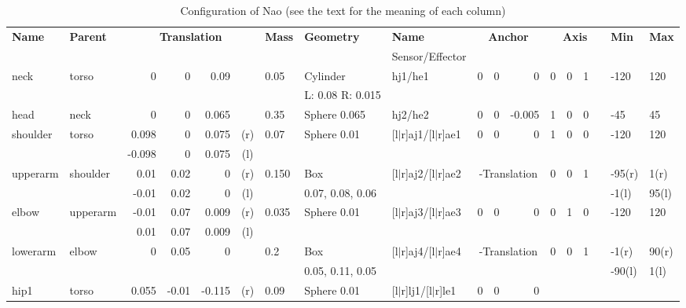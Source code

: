 \begin{landscape}
\begin{table}
  \centering
  \label{tab:nao-conf}
  \caption{Configuration of Nao (see the text for the meaning of each
    column)}
  \newcommand{\threegrid}[1]{\multicolumn{3}{c|}{#1}}
  \newcommand{\fourgrid}[1]{\multicolumn{4}{c|}{#1}}
  \begin{tabular}{|l|l|r@{,}r@{,}r@{}c|l|l|l|r@{,}r@{,}r|r@{,}r@{,}l@{}c|l|l|}
    \hline
    {\bf Name} & {\bf Parent} & \fourgrid{\bf Translation} &
    {\bf Mass} & {\bf Geometry} & {\bf Name} & \threegrid{\bf
      Anchor} & \fourgrid{\bf Axis} & {\bf Min} & {\bf Max} \\
     &  & \fourgrid{} & {} & {} & {Sensor/Effector} & \threegrid{} &
     \fourgrid{} & {} & \\
    \hline
    neck & torso & 0&0&0.09& & 0.05 & Cylinder & hj1/he1 & 0&0&0 & 0&0&1& &
    -120 & 120\\
    & & \fourgrid{} & & L: 0.08 R: 0.015 & & \threegrid{} & \fourgrid{} & &\\
    \hline
    head & neck & 0&0&0.065& & 0.35 & Sphere 0.065 & hj2/he2 & 0&0&-0.005 &
    1&0&0& & -45 & 45\\
    \hline
    shoulder & torso & 0.098&0&0.075&(r)  & 0.07 & Sphere 0.01&
    [l$\mid$r]aj1/[l$\mid$r]ae1 & 0&0&0 & 1&0&0& & -120 & 120 \\
    & & -0.098 & 0 & 0.075&(l) & & & & \threegrid{} & \fourgrid{} & & \\
    \hline
    upperarm & shoulder & 0.01&0.02&0&(r) & 0.150 &
    Box & [l$\mid$r]aj2/[l$\mid$r]ae2 & \threegrid{-Translation} & 0&0&1& &
    -95(r) & 1(r)  \\ & & -0.01 & 0.02 & 0&(l) & & 0.07, 0.08, 0.06 & & \threegrid{} & \fourgrid{} & -1(l) & 95(l) \\
    \hline
    elbow & upperarm & -0.01&0.07&0.009&(r) &
    0.035 & Sphere 0.01 & [l$\mid$r]aj3/[l$\mid$r]ae3 & 0&0&0 & 0&1&0& & -120 &
    120 \\ & & 0.01 & 0.07 & 0.009&(l) & & & & \threegrid{} & \fourgrid{} & &\\
    \hline
    lowerarm & elbow & 0&0.05&0& & 0.2 & Box & [l$\mid$r]aj4/[l$\mid$r]ae4 &
    \threegrid{-Translation} & 0&0&1& & -1(r) & 90(r) \\
    & & \fourgrid{} & & 0.05, 0.11, 0.05 & & \threegrid{} & \fourgrid{} & -90(l) & 1(l) \\
    \hline
    hip1 & torso & 0.055&-0.01&-0.115&(r) &
    0.09 & Sphere 0.01 & [l$\mid$r]lj1/[l$\mid$r]le1 & 0&0&0 &

\end{tabular}
\end{table}
\end{landscape}
